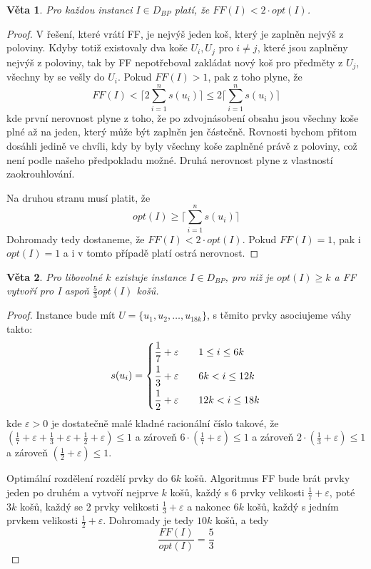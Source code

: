 \documentclass[11pt]{report} %
\newtheorem{theorem}{Věta}[section]
\numberwithin{equation}{section}
\begin{document}
\begin{theorem}
	Pro každou instanci $I \in D_{BP}$ platí, že $FF(I) < 2 \cdot opt(I)$.
\end{theorem}
\begin{proof}

V řešení, které vrátí FF, je nejvýš jeden koš, který je zaplněn nejvýš z poloviny. Kdyby totiž existovaly dva koše $U_i, U_j$ pro $i \neq j$, které jsou zaplněny nejvýš z poloviny, tak by FF nepotřeboval zakládat nový koš pro předměty z $U_j$, všechny by se vešly do $U_i$. Pokud $FF(I) > 1$, pak z toho plyne, že
	$$FF(I) < \lceil 2\sum\limits_{i=1}^{n} s(u_i)\rceil \leq 2 \lceil \sum\limits_{i=1}^{n}s(u_i)\rceil$$
kde první nerovnost plyne z toho, že po zdvojnásobení obsahu jsou všechny koše plné až na jeden, který může být zaplněn jen částečně. Rovnosti bychom přitom dosáhli jedině ve chvíli, kdy by byly všechny koše zaplněné právě z poloviny, což není podle našeho předpokladu možné. Druhá nerovnost plyne z vlastností zaokrouhlování.

Na druhou stranu musí platit, že
	$$opt(I) \geq \lceil \sum\limits_{i=1}^{n} s(u_i)\rceil$$
Dohromady tedy dostaneme, že $FF(I) < 2 \cdot opt(I)$. Pokud $FF(I) = 1$, pak i $opt(I) = 1$ a i v tomto případě platí ostrá nerovnost.
\end{proof}

\begin{theorem}
Pro libovolné $k$ existuje instance $I \in D_{BP}$, pro niž je $opt(I) \geq k$ a FF vytvoří pro I aspoň $\frac{5}{3}opt(I)$ košů.
\end{theorem}
\begin{proof}
	Instance bude mít $U = \{u_1, u_2, \dots, u_{18k}\}$, s těmito prvky asociujeme váhy takto:
	$$
	s(u_i) =
	\begin{dcases}
	\frac{1}{7} + \varepsilon &\quad 1 \leq i \leq 6k\\
	\frac{1}{3} + \varepsilon &\quad 6k < i \leq 12k	\\
	\frac{1}{2} + \varepsilon &\quad 12k < i \leq 18k \\
	\end{dcases}
	$$
	kde $\varepsilon > 0$ je dostatečně malé kladné racionální číslo takové, že 
	$\left(\frac{1}{7} + \varepsilon + \frac{1}{3} + \varepsilon + \frac{1}{2} + \varepsilon\right) \leq 1$ a zároveň $6\cdot\left( \frac{1}{7} + \varepsilon \right) \leq 1$ a zároveň
	$2\cdot\left(\frac{1}{3} + \varepsilon\right) \leq 1$ a zároveň
	$\left(\frac{1}{2} + \varepsilon\right) \leq 1$.

	Optimální rozdělení rozdělí prvky do $6k$ košů. Algoritmus FF bude brát prvky jeden po druhém a vytvoří nejprve $k$ košů, každý s 6 prvky velikosti $\frac{1}{7} + \varepsilon$, poté $3k$ košů, každý se 2 prvky velikosti $\frac{1}{3} + \varepsilon$ a nakonec $6k$ košů, každý s jedním prvkem velikosti $\frac{1}{2} + \varepsilon$. Dohromady je tedy $10k$ košů, a tedy 
	$$\frac{FF(I)}{opt(I)} = \frac{5}{3}$$
\end{proof}
\end{document}
